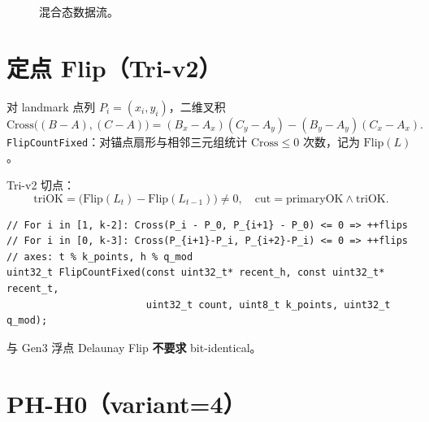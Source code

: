 \begin{figure}[htbp]
\centering
{}
\caption{混合态数据流。}
\label{fig:gen5-hybrid}
\end{figure}

\section{定点 Flip（Tri-v2）}

对 landmark 点列 $P_i=(x_i,y_i)$，二维叉积
\begin{equation}
\mathrm{Cross}\bigl((B-A),(C-A)\bigr)
=(B_x-A_x)(C_y-A_y)-(B_y-A_y)(C_x-A_x).
\end{equation}
\texttt{FlipCountFixed}：对锚点扇形与相邻三元组统计 $\mathrm{Cross}\le 0$ 次数，记为 $\mathrm{Flip}(L)$。

Tri-v2 切点：
\begin{equation}
\mathrm{triOK}=\bigl(\mathrm{Flip}(L_t)-\mathrm{Flip}(L_{t-1})\bigr)\neq 0,\quad
\mathrm{cut}=\mathrm{primaryOK}\land\mathrm{triOK}.
\end{equation}

\begin{lstlisting}[caption={Gen5 Flip 核心（\filepath{topo\_ph\_scan.cc} 摘要）},label={lst:gen5-flip}]
// For i in [1, k-2]: Cross(P_i - P_0, P_{i+1} - P_0) <= 0 => ++flips
// For i in [0, k-3]: Cross(P_{i+1}-P_i, P_{i+2}-P_i) <= 0 => ++flips
// axes: t % k_points, h % q_mod
uint32_t FlipCountFixed(const uint32_t* recent_h, const uint32_t* recent_t,
                        uint32_t count, uint8_t k_points, uint32_t q_mod);
\end{lstlisting}

与 Gen3 浮点 Delaunay Flip \textbf{不要求} bit-identical。

\section{PH-H0（variant=4）}

